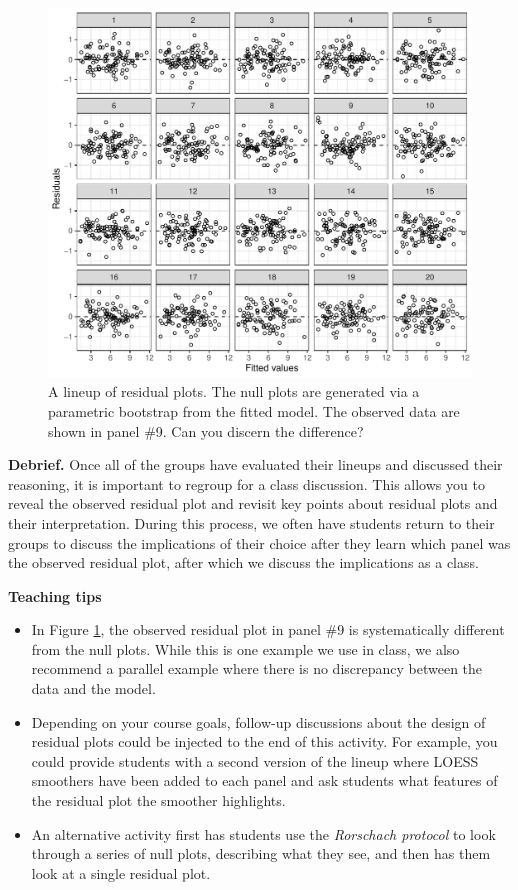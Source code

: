 \documentclass[12pt]{article}
\begin{document}
\begin{figure}
\centering
\includegraphics{figs/residual_lineup.pdf}
\caption{\label{fig:lineupresid} A lineup of residual plots. The null
plots are generated via a parametric bootstrap from the fitted model.
The observed data are shown in panel \#9. Can you discern the
difference?}
\end{figure}

\textbf{Debrief.} Once all of the groups have evaluated their lineups
and discussed their reasoning, it is important to regroup for a class
discussion. This allows you to reveal the observed residual plot and
revisit key points about residual plots and their interpretation. During
this process, we often have students return to their groups to discuss
the implications of their choice after they learn which panel was the
observed residual plot, after which we discuss the implications as a
class.

\textbf{Teaching tips}

\begin{itemize}
\item
  In Figure \ref{fig:lineupresid}, the observed residual plot in panel
  \#9 is systematically different from the null plots. While this is one
  example we use in class, we also recommend a parallel example where
  there is no discrepancy between the data and the model.
\item
  Depending on your course goals, follow-up discussions about the design
  of residual plots could be injected to the end of this activity. For
  example, you could provide students with a second version of the
  lineup where LOESS smoothers have been added to each panel and ask
  students what features of the residual plot the smoother highlights.
\item
  An alternative activity first has students use the
  \emph{Rorschach protocol} \citep{Buja-2009bd} to look through a series
  of null plots, describing what they see, and then has them look at a
  single residual plot.
\end{itemize}
\end{document}
